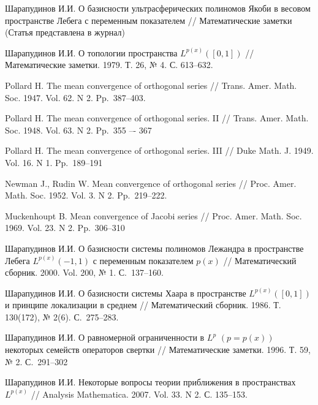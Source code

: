 \begin{thebibliography}{1} %

Шарапудинов И.И. О базисности ультрасферических полиномов Якоби в весовом пространстве Лебега с переменным показателем // Математические заметки (Статья представлена в журнал)




Шарапудинов И.И. О топологии пространства  $ L^{p(x)}([0,1])$ // Математические заметки. 1979. Т. 26, № 4. С. 613--632.



Pollard H. The mean convergence of orthogonal series // Trans. Amer. Math. Soc. 1947. Vol. 62. N 2. Pp.~387--403.

Pollard H. The mean convergence of orthogonal series. II // Trans. Amer. Math. Soc. 1948. Vol. 63. N 2. Pp.~355 –- 367

 Pollard H. The mean convergence of orthogonal series. III // Duke Math. J. 1949. Vol. 16. N 1. Pp.~189--191

Newman J., Rudin W. Mean convergence of orthogonal series // Proc. Amer. Math. Soc. 1952. Vol. 3. N 2. Pp.~219--222.

 Muckenhoupt B. Mean convergence of Jacobi series // Proc. Amer. Math. Soc. 1969. Vol. 23. N 2. Pp.~306--310

Шарапудинов И.И. О базисности системы полиномов Лежандра в пространстве Лебега
 $L^{p(x)}(-1,1)$ с переменным показателем $p(x)$ // Математический сборник. 2000. Vol. 200, № 1. С.~137--160.


Шарапудинов И.И. О базисности системы Хаара в пространстве $L^{p(x)}([0,1])$ и принципе локализации в среднем // Математический сборник. 1986. Т. 130(172), № 2(6). С.~275--283.




 Шарапудинов И.И. О равномерной ограниченности в $L^p$ $(p=p(x))$ некоторых семейств операторов свертки // Математические заметки. 1996. Т. 59, № 2. С.~291--302



Шарапудинов И.И. Некоторые вопросы теории приближения в пространствах $L^{p(x)}$ // Analysis Mathematica. 2007. Vol. 33. N 2. С. 135--153.


\end{thebibliography}
